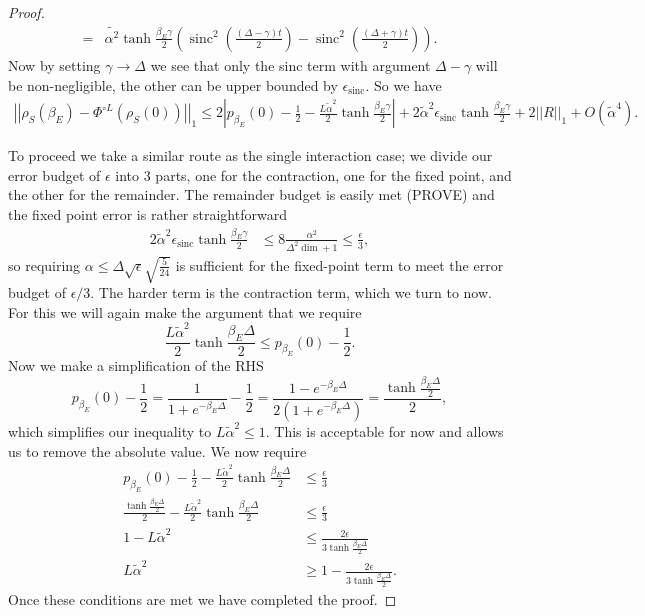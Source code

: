 \documentclass{article}
\newcommand{\parens}[1]{\left( #1 \right)}
\newcommand{\norm}[1]{\left| \left| #1 \right| \right|}
\newcommand{\bigo}[1]{O\left( #1 \right)}
\DeclareMathOperator{\sinc}{sinc}
\begin{document}
\begin{proof}
\begin{align}
    = &\widetilde{\alpha^2} \tanh \frac{\beta_E \gamma}{2} \left( \sinc^2\parens{\frac{(\Delta - \gamma) t}{2}} - \sinc^2\parens{\frac{(\Delta + \gamma) t}{2}} \right).
\end{align}
Now by setting $\gamma \to \Delta$ we see that only the sinc term with argument $\Delta - \gamma$ will be non-negligible, the other can be upper bounded by $\epsilon_{\sinc}$. So we have
\begin{align}
    \norm{\rho_S(\beta_E) - \Phi^{\circ L}(\rho_S(0))}_1 \le 2\left| p_{\beta_E}(0) - \frac{1}{2} - \frac{L\widetilde{\alpha}^2 }{2} \tanh \frac{\beta_E \gamma} {2} \right| + 2\widetilde{\alpha}^2 \epsilon_{\sinc} \tanh \frac{\beta_E \gamma}{2} + 2\norm{R}_1 + \bigo{\widetilde{\alpha}^4}.
\end{align}

To proceed we take a similar route as the single interaction case; we divide our error budget of $\epsilon$ into 3 parts, one for the contraction, one for the fixed point, and the other for the remainder. The remainder budget is easily met (PROVE) and the fixed point error is rather straightforward
\begin{align}
    2\widetilde{\alpha}^2 \epsilon_{\sinc} \tanh \frac{\beta_E \gamma}{2} &\le 8 \frac{\alpha^2}{\Delta^2 \dim + 1} \le \frac{\epsilon}{3},
\end{align}
so requiring $\alpha \le \Delta \sqrt{\epsilon} \sqrt{\frac{5}{24}}$ is sufficient for the fixed-point term to meet the error budget of $\epsilon / 3$.
The harder term is the contraction term, which we turn to now. For this we will again make the argument that we require
\begin{equation}
    \frac{L \widetilde{\alpha}^2}{2} \tanh \frac{\beta_E \Delta}{2} \le p_{\beta_E}(0) - \frac{1}{2}.
\end{equation}
Now we make a simplification of the RHS
\begin{equation}
    p_{\beta_E}(0) - \frac{1}{2} = \frac{1}{1 + e^{-\beta_E \Delta}} - \frac{1}{2} = \frac{1 - e^{-\beta_E \Delta}}{2(1 + e^{-\beta_E \Delta})} = \frac{\tanh \frac{\beta_E \Delta}{2}}{2},
\end{equation}
which simplifies our inequality to $L \widetilde{\alpha }^2 \le 1$. This is acceptable for now and allows us to remove the absolute value.
We now require
\begin{align}
    p_{\beta_E}(0) - \frac{1}{2} - \frac{L \widetilde{\alpha}^2}{2} \tanh{\frac{\beta_E \Delta}{2}} &\le \frac{\epsilon}{3} \\
    \frac{\tanh \frac{\beta_E \Delta}{2}}{2} - \frac{L \widetilde{\alpha}^2}{2} \tanh{\frac{\beta_E \Delta}{2}}  &\le \frac{\epsilon}{3} \\
    1 - L \widetilde{\alpha}^2 &\le \frac{2 \epsilon}{3 \tanh \frac{\beta_E \Delta}{2}} \\ 
    L\widetilde{\alpha}^2 &\geq 1 - \frac{2 \epsilon}{3 \tanh \frac{\beta_E \Delta}{2}}.
\end{align}
Once these conditions are met we have completed the proof.
\end{proof}
\end{document}
